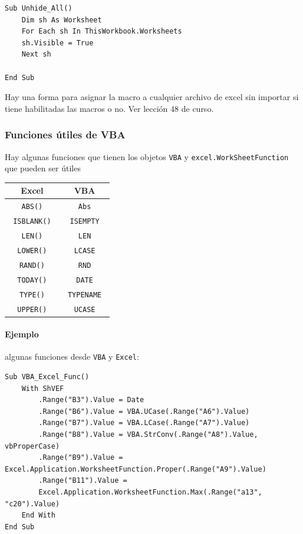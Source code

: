 \begin{verbatim}
Sub Unhide_All()
    Dim sh As Worksheet
    For Each sh In ThisWorkbook.Worksheets
    sh.Visible = True
    Next sh
    
End Sub
\end{verbatim}

Hay una forma para asignar la macro a cualquier archivo de excel sin importar si tiene habilitadas las macros o no. Ver lección 48 de curso.

\subsubsection{Funciones útiles de VBA}

Hay algunas funciones que tienen los objetos \texttt{VBA} y \texttt{excel.WorkSheetFunction} que pueden ser útiles

\begin{table}[H]
    \centering
    \begin{tabular}{c|c}
       \rowcolor{micolor1} Excel & VBA \\ \hline
        \texttt{ ABS() } & \texttt{ Abs } \\
        \texttt{ ISBLANK() } & \texttt{ ISEMPTY } \\
        \texttt{ LEN() } & \texttt{ LEN } \\
        \texttt{ LOWER() } & \texttt{ LCASE }\\
        \texttt{ RAND() } & \texttt{ RND } \\
        \texttt{ TODAY() } & \texttt{ DATE } \\
        \texttt{ TYPE() } & \texttt{ TYPENAME } \\
        \texttt{ UPPER() } & \texttt{ UCASE } \\
    \end{tabular}
\end{table}

\paragraph{Ejemplo} algunas funciones desde \texttt{VBA} y \texttt{Excel}:

\begin{verbatim}
Sub VBA_Excel_Func()
    With ShVEF
        .Range("B3").Value = Date
        .Range("B6").Value = VBA.UCase(.Range("A6").Value)
        .Range("B7").Value = VBA.LCase(.Range("A7").Value)
        .Range("B8").Value = VBA.StrConv(.Range("A8").Value, vbProperCase)
        .Range("B9").Value = Excel.Application.WorksheetFunction.Proper(.Range("A9").Value)
        .Range("B11").Value = 
        Excel.Application.WorksheetFunction.Max(.Range("a13", "c20").Value)
    End With
End Sub
\end{verbatim}

